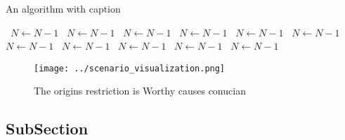 \documentclass[a4paper]{article}
\begin{document}
\begin{algorithm}
\caption{An algorithm with caption}
\begin{algorithmic}
\    \State $N \gets N - 1$
\    \State $N \gets N - 1$
\    \State $N \gets N - 1$
\    \State $N \gets N - 1$
\    \State $N \gets N - 1$
\    \State $N \gets N - 1$
\    \State $N \gets N - 1$
\    \State $N \gets N - 1$
\    \State $N \gets N - 1$
\    \State $N \gets N - 1$
\    \State $N \gets N - 1$
\EndWhile
\end{algorithmic}
\end{algorithm}

\begin{figure}
\centering
\texttt{[image: ../scenario\_visualization.png]}
\caption{The origins restriction is Worthy causes conucian
}
\end{figure}
 
\subsection{SubSection}
\end{document}

